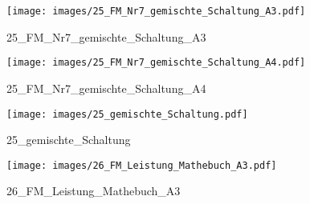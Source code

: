 %
%
\begin{figure}[!hb]%
    \centering
  \texttt{[image: images/25\_FM\_Nr7\_gemischte\_Schaltung\_A3.pdf]}%
  \caption{25_FM_Nr7_gemischte_Schaltung_A3}%
\end{figure}

%
%
\begin{figure}[!hb]%
    \centering
  \texttt{[image: images/25\_FM\_Nr7\_gemischte\_Schaltung\_A4.pdf]}%
  \caption{25_FM_Nr7_gemischte_Schaltung_A4}%
\end{figure}

%
%
\begin{figure}[!hb]%
    \centering
  \texttt{[image: images/25\_gemischte\_Schaltung.pdf]}%
  \caption{25_gemischte_Schaltung}%
\end{figure}

%
%
\begin{figure}[!hb]%
    \centering
  \texttt{[image: images/26\_FM\_Leistung\_Mathebuch\_A3.pdf]}%
  \caption{26_FM_Leistung_Mathebuch_A3}%
\end{figure}


